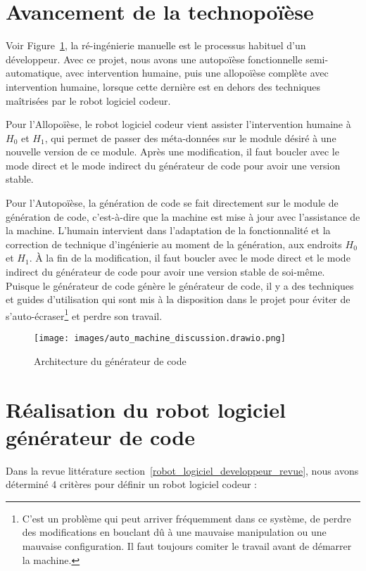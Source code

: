 \section{Avancement de la technopoïèse}\label{avancement_technopoiese}
Voir Figure~\ref{fig:dia_auto_machine_discussion}, la ré-ingénierie manuelle est le processus habituel d'un développeur. Avec ce projet, nous avons une autopoïèse fonctionnelle semi-automatique, avec intervention humaine, puis une allopoïèse complète avec intervention humaine, lorsque cette dernière est en dehors des techniques maîtrisées par le robot logiciel codeur.

Pour l'Allopoïèse, le robot logiciel codeur vient assister l'intervention humaine à $H_0$ et $H_1$, qui permet de passer des méta-données sur le module désiré à une nouvelle version de ce module. Après une modification, il faut boucler avec le mode direct et le mode indirect du générateur de code pour avoir une version stable.

Pour l'Autopoïèse, la génération de code se fait directement sur le module de génération de code, c'est-à-dire que la machine est mise à jour avec l'assistance de la machine. L'humain intervient dans l'adaptation de la fonctionnalité et la correction de technique d'ingénierie au moment de la génération, aux endroits $H_0$ et $H_1$. À la fin de la modification, il faut boucler avec le mode direct et le mode indirect du générateur de code pour avoir une version stable de soi-même. Puisque le générateur de code génère le générateur de code, il y a des techniques et guides d'utilisation qui sont mis à la disposition dans le projet pour éviter de s'auto-écraser\footnote{C'est un problème qui peut arriver fréquemment dans ce système, de perdre des modifications en bouclant dû à une mauvaise manipulation ou une mauvaise configuration. Il faut toujours comiter le travail avant de démarrer la machine.} et perdre son travail.

\begin{figure}
\centering
\texttt{[image: images/auto\_machine\_discussion.drawio.png]}
\caption{Architecture du générateur de code}
\label{fig:dia_auto_machine_discussion}
\end{figure}


\section{Réalisation du robot logiciel générateur de code}
Dans la revue littérature section~\ref{robot_logiciel_developpeur_revue}, nous avons déterminé 4 critères pour définir un robot logiciel codeur :
